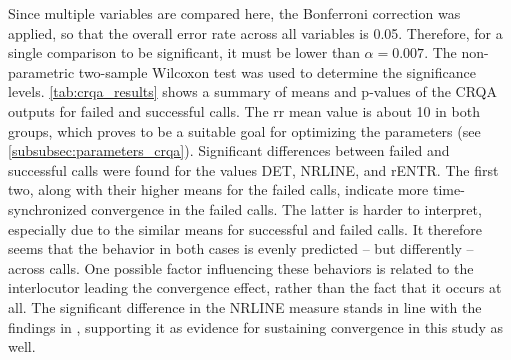 Since multiple variables are compared here, the Bonferroni correction \citep{Bonferroni1936teoria} was applied, so that the overall error rate across all variables is \num{0.05}.
Therefore, for a single comparison to be significant, it must be lower than $\alpha = 0.007$.
The non-parametric two-sample Wilcoxon test \citep{Wilcoxon1945individual} was used to determine the significance levels.
\cref{tab:crqa_results} shows a summary of means and p-values of the CRQA outputs for failed and successful calls.
The \ac{rr} mean value is about 10 in both groups, which proves to be a suitable goal for optimizing the parameters (see \cref{subsubsec:parameters_crqa}).
Significant differences between failed and successful calls were found for the values DET, NRLINE, and rENTR.
The first two, along with their higher means for the failed calls, indicate more time-synchronized convergence in the failed calls.
The latter is harder to interpret, especially due to the similar means for successful and failed calls.
It therefore seems that the behavior in both cases is evenly predicted -- but differently -- across calls.
One possible factor influencing these behaviors is related to the interlocutor leading the convergence effect, rather than the fact that it occurs at all.
The significant difference in the NRLINE measure stands in line with the findings in \citet{Borrie2019syncing}, supporting it as evidence for sustaining convergence in this study as well.


